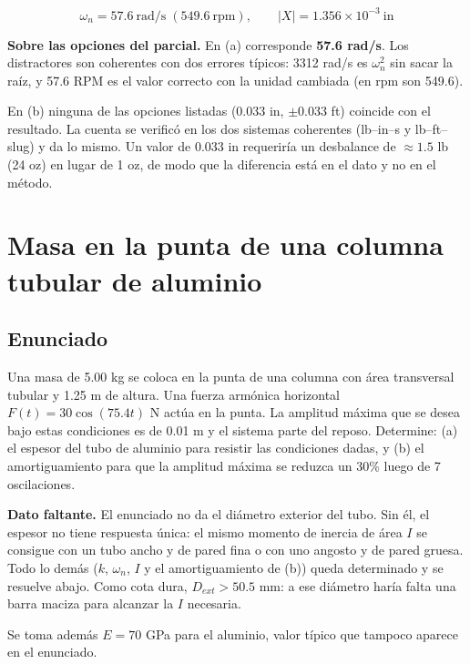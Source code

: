 \documentclass[12pt,letterpaper]{article}
\begin{document}
\begin{equation}
\boxed{\;\omega_n = 57.6\ \text{rad/s} \;(549.6\ \text{rpm}), \qquad
|X| = 1.356\times10^{-3}\ \text{in}\;}
\end{equation}

\begin{aviso}
\textbf{Sobre las opciones del parcial.} En (a) corresponde \textbf{57.6 rad/s}. Los
distractores son coherentes con dos errores típicos: 3312 rad/s es $\omega_n^2$ sin
sacar la raíz, y 57.6 RPM es el valor correcto con la unidad cambiada (en rpm son
549.6).

En (b) ninguna de las opciones listadas (0.033 in, $\pm$0.033 ft) coincide con el
resultado. La cuenta se verificó en los dos sistemas coherentes (lb--in--s y
lb--ft--slug) y da lo mismo. Un valor de 0.033 in requeriría un desbalance de
$\approx 1.5$ lb (24 oz) en lugar de 1 oz, de modo que la diferencia está en el dato
y no en el método.
\end{aviso}

\newpage
\section{Masa en la punta de una columna tubular de aluminio}

\subsection{Enunciado}

Una masa de 5.00 kg se coloca en la punta de una columna con área transversal tubular
y 1.25 m de altura. Una fuerza armónica horizontal $F(t) = 30\cos(75.4t)$ N actúa en
la punta. La amplitud máxima que se desea bajo estas condiciones es de 0.01 m y el
sistema parte del reposo. Determine: (a) el espesor del tubo de aluminio para resistir
las condiciones dadas, y (b) el amortiguamiento para que la amplitud máxima se reduzca
un 30\% luego de 7 oscilaciones.

\begin{aviso}
\textbf{Dato faltante.} El enunciado no da el diámetro exterior del tubo. Sin él, el
espesor no tiene respuesta única: el mismo momento de inercia de área $I$ se consigue
con un tubo ancho y de pared fina o con uno angosto y de pared gruesa. Todo lo demás
($k$, $\omega_n$, $I$ y el amortiguamiento de (b)) queda determinado y se resuelve
abajo. Como cota dura, $D_{ext} > 50.5$ mm: a ese diámetro haría falta una barra
maciza para alcanzar la $I$ necesaria.

Se toma además $E = 70$ GPa para el aluminio, valor típico que tampoco aparece en el
enunciado.
\end{aviso}
\end{document}
